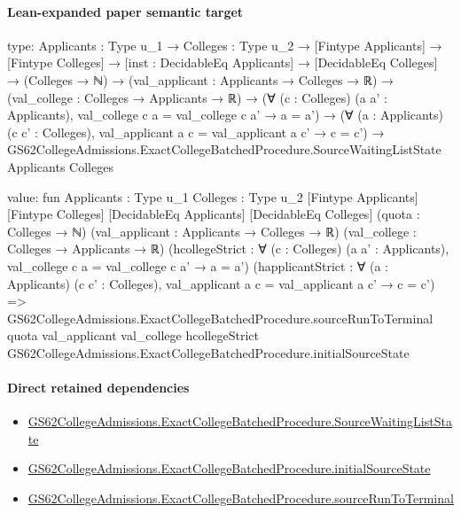 \documentclass[10pt]{article}
\begin{document}
\paragraph{Lean-expanded paper semantic target}
\begin{ReviewVerbatim}
type:
{Applicants : Type u_1} →
  {Colleges : Type u_2} →
    [Fintype Applicants] →
      [Fintype Colleges] →
        [inst : DecidableEq Applicants] →
          [DecidableEq Colleges] →
            (Colleges → ℕ) →
              (val_applicant : Applicants → Colleges → ℝ) →
                (val_college : Colleges → Applicants → ℝ) →
                  (∀ (c : Colleges) (a a' : Applicants), val_college c a = val_college c a' → a = a') →
                    (∀ (a : Applicants) (c c' : Colleges), val_applicant a c = val_applicant a c' → c = c') →
                      GS62CollegeAdmissions.ExactCollegeBatchedProcedure.SourceWaitingListState Applicants Colleges

value:
fun {Applicants : Type u_1} {Colleges : Type u_2} [Fintype Applicants] [Fintype Colleges] [DecidableEq Applicants]
    [DecidableEq Colleges] (quota : Colleges → ℕ) (val_applicant : Applicants → Colleges → ℝ)
    (val_college : Colleges → Applicants → ℝ)
    (hcollegeStrict : ∀ (c : Colleges) (a a' : Applicants), val_college c a = val_college c a' → a = a')
    (happlicantStrict : ∀ (a : Applicants) (c c' : Colleges), val_applicant a c = val_applicant a c' → c = c') =>
  GS62CollegeAdmissions.ExactCollegeBatchedProcedure.sourceRunToTerminal quota val_applicant val_college hcollegeStrict
    GS62CollegeAdmissions.ExactCollegeBatchedProcedure.initialSourceState
\end{ReviewVerbatim}

\paragraph{Direct retained dependencies}
\begin{itemize}\raggedright
\item \hyperlink{governing-declaration-2a222855a7d234b6}{GS62\allowbreak{}College\allowbreak{}Admissions.\allowbreak{}Exact\allowbreak{}College\allowbreak{}Batched\allowbreak{}Procedure.\allowbreak{}Source\allowbreak{}Waiting\allowbreak{}List\allowbreak{}State}
\item \hyperlink{governing-declaration-54e4e9a72cd03d42}{GS62\allowbreak{}College\allowbreak{}Admissions.\allowbreak{}Exact\allowbreak{}College\allowbreak{}Batched\allowbreak{}Procedure.\allowbreak{}initial\allowbreak{}Source\allowbreak{}State}
\item \hyperlink{governing-declaration-5f295db79d7f234f}{GS62\allowbreak{}College\allowbreak{}Admissions.\allowbreak{}Exact\allowbreak{}College\allowbreak{}Batched\allowbreak{}Procedure.\allowbreak{}source\allowbreak{}Run\allowbreak{}To\allowbreak{}Terminal}
\end{itemize}
\end{document}
